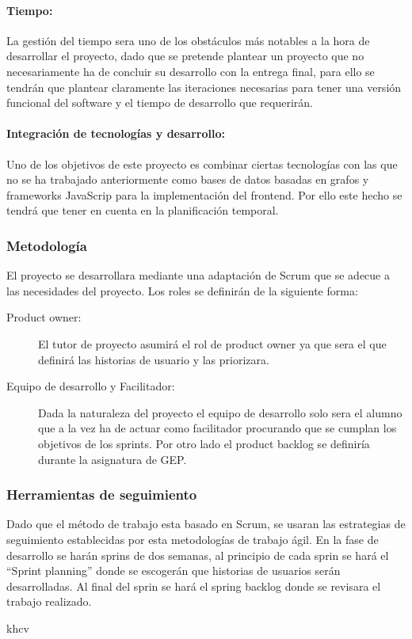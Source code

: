 \documentclass[12pt]{article} %
\begin{document}
\paragraph{Tiempo:}
La gestión del tiempo sera uno de los obstáculos más notables a la hora de desarrollar el proyecto, dado que se pretende plantear un proyecto que no necesariamente ha de concluir su desarrollo con la entrega final, para ello se tendrán que plantear claramente las iteraciones necesarias para tener una versión funcional del software y el tiempo de desarrollo que requerirán.
\paragraph{Integración de tecnologías y desarrollo:}
Uno de los objetivos de este proyecto es combinar ciertas tecnologías con las que no se ha trabajado anteriormente como bases de datos basadas en grafos y frameworks JavaScrip para la implementación del frontend. Por ello este hecho se tendrá que tener en cuenta en la planificación temporal.

\subsubsection{Metodología}
El proyecto se desarrollara mediante una adaptación de Scrum que se adecue a las necesidades del proyecto.
Los roles se definirán de la siguiente forma:
\begin{description}
\item[Product owner:] El tutor de proyecto asumirá el rol de product owner ya que sera el que definirá las historias de usuario y las priorizara.
\item[Equipo de desarrollo y Facilitador:] Dada la naturaleza del proyecto el equipo de desarrollo solo sera el alumno que a la vez ha de actuar como facilitador procurando que se cumplan los objetivos de los sprints.
Por otro lado el product backlog se definiría durante la asignatura de GEP.
\end{description}

\subsubsection{Herramientas de seguimiento}
Dado que el método de trabajo esta basado en Scrum, se usaran las estrategias de seguimiento establecidas por esta metodologías  de trabajo ágil.
En la fase de desarrollo se harán sprins de dos semanas, al principio de cada sprin se hará el “Sprint planning” donde se escogerán que historias de usuarios serán desarrolladas. Al final del sprin se hará el spring backlog donde se revisara el trabajo realizado.

\newpage

khcv
\end{document}
